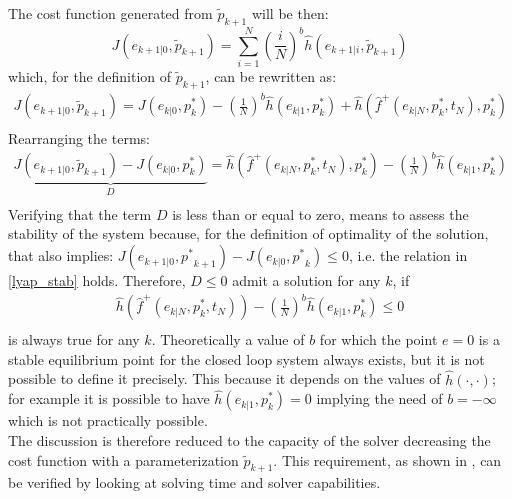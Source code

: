 \documentclass[12pt]{article}
\begin{document}
The cost function generated from $\tilde{p}_{k+1}$ will be then:
\begin{equation}
	J({e}_{k+1|0},\tilde{p}_{k+1})=\sum_{i=1}^{N}\left(\frac{i}{N}\right)^b\hat{h}(e_{k+1|i},\tilde{p}_{k+1})
\end{equation}
which, for the definition of $\tilde{p}_{k+1}$, can be rewritten as:
\begin{equation}
\begin{split}
	J({e}_{k+1|0},\tilde{p}_{k+1})=J({e}_{k|0},p^*_k) -\left( \frac{1}{N} \right)^b\hat{h}(e_{k|1},p^*_{k}) + \hat{h}(\hat{f}^+(e_{k|N},p^*_k,t_N),p^*_k) \\
\end{split}
\end{equation}
Rearranging the terms:
\begin{equation}
\begin{split}
	\underbrace{J({e}_{k+1|0},\tilde{p}_{k+1})-J({e}_{k|0},p^*_k)}_{D}= \hat{h}(\hat{f}^+(e_{k|N},p^*_k,t_N),p^*_k) -\left( \frac{1}{N} \right)^b\hat{h}(e_{k|1},p^*_{k}) \\
\end{split}
\end{equation}
Verifying that the term $D$ is less than or equal to zero, means to assess the stability of the system because, for the definition of optimality of the solution, that also implies: $J({e}_{k+1|0},{p^*}_{k+1}) - J({e}_{k|0},{p^*}_k) \leq 0$, i.e. the relation in \ref{lyap_stab} holds. Therefore, $D\leq0$ admit a solution for any $k$, if 
\begin{equation}
\begin{split}
	\hat{h}(\hat{f}^+(e_{k|N},p^*_k,t_N))-\left( \frac{1}{N} \right)^b\hat{h}(e_{k|1},p^*_{k}) \leq 0 \\
\end{split}
\end{equation}
is always true for any $k$. Theoretically a value of $b$ for which the point $e=0$ is a stable equilibrium point for the closed loop system always exists, but it is not possible to define it precisely. This because it depends on the values of $\hat{h}(\cdot,\cdot)$; for example it is possible to have $\hat{h}(e_{k|1},p^*_{k})=0$ implying the need of $b=-\infty$ which is not practically possible.\\ The discussion is therefore reduced to the capacity of the solver decreasing the cost function with a parameterization $\tilde{p}_{k+1}$. This requirement, as shown in \cite{alamir_boh}, can be verified by looking at solving time and solver capabilities.
\end{document}
